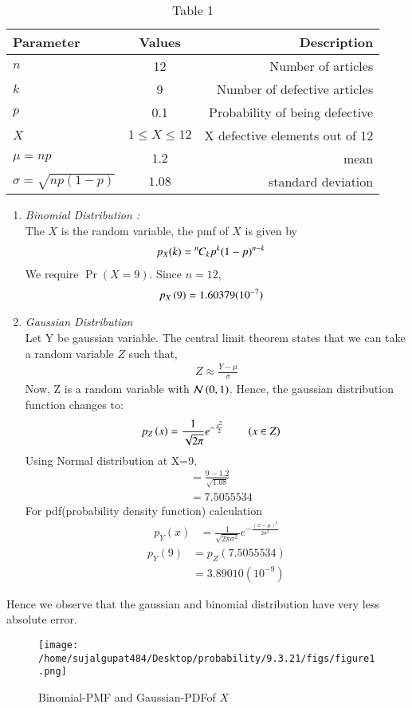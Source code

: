 \documentclass[journal,12pt,twocolumn]{IEEEtran}
\theoremstyle{remark}
\begin{document}
\solution
\begin{table}[h!]
 \begin{center}
    \begin{tabular}{|l|c|r|}
    \hline
    Parameter & Values & Description\\
    \hline
    $n$ & 12 & Number of articles\\
    \hline
    $k$ & 9 & Number of defective articles\\
    \hline
    $p$ & 0.1 & Probability of being defective\\
    \hline
    $X$ & $1\leq X \leq 12$
    & X defective elements out of 12\\
    \hline
    $\mu=np$ & $1.2$ & mean\\
    \hline
    $\sigma=\sqrt{np(1-p)}$ & $1.08$ & standard deviation\\
    \hline
    \end{tabular}
    \end{center}
    \caption{Table 1}
  \label{tab:ncert/9/3/21/} 
\end{table}
\begin{enumerate}
   \item{ \em{Binomial Distribution :}}\\The $X$ is the random variable, the pmf of $X$ is given by
    \begin{align}
p_X(k)&={{}^{n}\mkern-1muC_{k}}p^k(1-p)^{n-k}
\end{align}    
  We require $\Pr(X = 9)$. Since $n = 12$,
             \begin{align}
                p_X\left(9\right) &= 1.60379(10^{-7})
             \end{align}
             
             \item{ \em{Gaussian Distribution}}\\
             Let Y be gaussian variable.
The central limit theorem states that we can take a random variable $Z$ such that,
\begin{align}
Z \approx \frac{Y-\mu}{\sigma}
\end{align}
Now, Z is a random variable with $\mathcal{N}\left(0,1\right)$. Hence, the gaussian distribution function changes to:
\begin{align}
p_Z\left(x\right) &= \frac{1}{\sqrt{2\pi}} e^{-\frac{{x}^2}{2}} \qquad \left(x \in Z\right)\label{9.3.21}
\end{align}
Using Normal distribution at X=9.
\begin{align}
&=\frac{9-1.2}{\sqrt{1.08}}\\
&=7.5055534
\end{align}
For pdf(probability density function) calculation
\begin{align}
p_Y(x)&=\frac{1}{\sqrt{2\pi\sigma^2}}e^{-\frac{(x-\mu)^2}{2\sigma^2}}
\end{align}
\begin{align}
p_Y(9)&=p_Z(7.5055534)\\
&=3.89010(10^{-9})
\end{align}
\end{enumerate}
Hence we observe that the gaussian and binomial distribution have very less absolute error.
\begin{figure}
\centering
\texttt{[image: /home/sujalgupat484/Desktop/probability/9.3.21/figs/figure1.png]}
\caption{ Binomial-PMF and Gaussian-PDFof $X$}
\end{figure}
\end{document}
